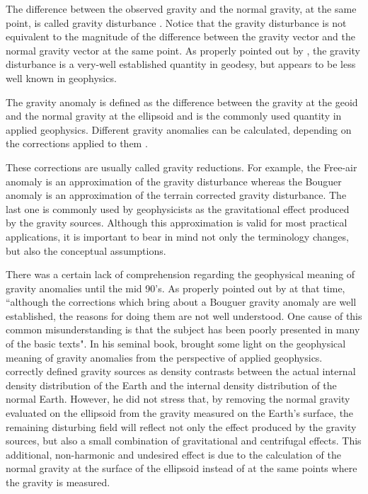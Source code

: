 \documentclass[manuscript]{geophysics}
\begin{document}
The difference between the observed gravity and the
normal gravity, at the same point, is called gravity disturbance
\citep{hofmann-wellenhof-moritz2005}.
Notice that the gravity disturbance is not equivalent to the
magnitude of the difference between the gravity vector
and the normal gravity vector at the same point.
As properly pointed out by \citet{hackney-featherstone2003},
the gravity disturbance is a very-well established quantity in geodesy,
but appears to be less well known in geophysics.


The gravity anomaly is defined as the difference
between the gravity at the geoid and the normal gravity at the ellipsoid
and is the commonly used quantity in applied geophysics.
Different gravity anomalies can be calculated, depending on the
corrections applied to them \citep{blakely1996, hofmann-wellenhof-moritz2005}.


These corrections are usually called gravity reductions.
For example, the Free-air anomaly is an approximation of the
gravity disturbance whereas the Bouguer anomaly
is an approximation of the terrain corrected gravity disturbance.
The last one is commonly used by geophysicists as the
gravitational effect produced by the gravity sources.
Although this approximation is valid for most practical applications,
it is important to bear in mind not only the terminology 
changes, but also the conceptual assumptions.



There was a certain lack of comprehension regarding the
geophysical meaning of gravity anomalies until the
mid 90's.
As properly pointed out by \citet{chapin1996} at that time, 
``although the corrections which bring about a Bouguer 
gravity anomaly are well established, the reasons for doing
them are not well understood. One cause of this common 
misunderstanding is that the subject has been poorly presented in
many of the basic texts".
In his seminal book, \citet{blakely1996} brought some light
on the geophysical meaning of gravity anomalies from the 
perspective of applied geophysics. \citet{blakely1996} correctly
defined gravity sources as density contrasts between the actual
internal density distribution of the Earth and the internal density
distribution of the normal Earth.
However, he did not stress that, by removing the normal gravity 
evaluated on the ellipsoid from the gravity measured 
on the Earth's surface, the remaining disturbing field will reflect 
not only the effect produced by the gravity sources, but also a
small combination of gravitational and centrifugal effects.
This additional, non-harmonic and undesired effect is 
due to the calculation of the normal gravity at the surface of the ellipsoid
instead of at the same points where the gravity is measured.
\end{document}
